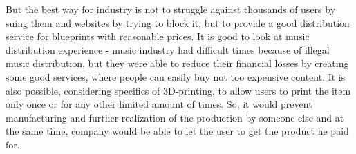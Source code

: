 But the best way for industry is not to struggle against thousands of users by suing them and websites by trying to block it, but to provide a good distribution service for blueprints with reasonable prices. It is good to look at music distribution experience - music industry had difficult times because of illegal music distribution, but they were able to reduce their financial losses by creating some good services, where people can easily buy not too expensive content.
It is also possible, considering specifics of 3D-printing, to allow users to print the item only once or for any other limited amount of times. So, it would prevent manufacturing and further realization of the production by someone else and at the same time, company would be able to let the user to get the product he paid for.